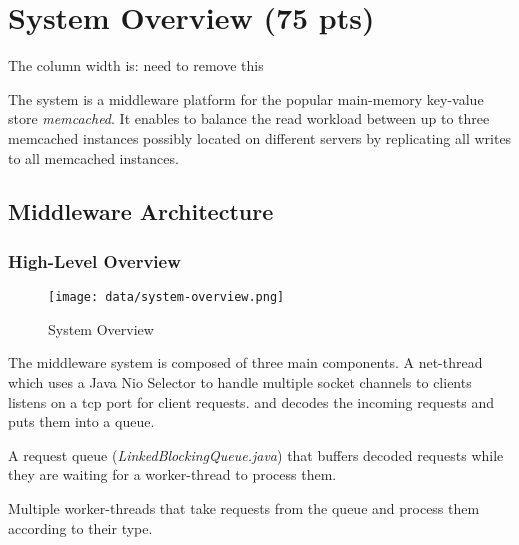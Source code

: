 \documentclass[report.tex]{subfiles}
\begin{document}
\section{System Overview (75 pts)}

The column width is: \the\columnwidth
need to remove this


The system is a middleware platform for the popular main-memory key-value store \emph{memcached}. 
It enables to balance the read workload between up to three memcached instances possibly located on different servers by replicating all writes to all memcached instances.


\subsection{Middleware Architecture}
\subsubsection{High-Level Overview}

\begin{figure}
	\centering
	\texttt{[image: data/system-overview.png]}
	\caption{System Overview}
\end{figure}
The middleware system is composed of three main components. 
A net-thread which uses a Java Nio Selector to handle multiple socket channels to clients listens on a tcp port for client requests. and decodes the incoming requests and puts them into a queue.

A request queue (\emph{LinkedBlockingQueue.java}) that buffers decoded requests while they are waiting for a worker-thread to process them.

Multiple worker-threads that take requests from the queue and process them according to their type.
\end{document}
